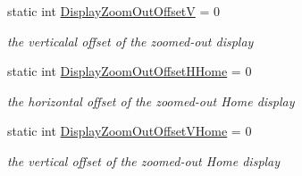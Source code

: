 \begin{DoxyCompactItemize}
\mbox{\label{class_t_display_a3c63a18e8901299ab56176c034072b1c}} 
static int \mbox{\hyperlink{class_t_display_a3c63a18e8901299ab56176c034072b1c}{Display\+Zoom\+Out\+OffsetV}} = 0
\begin{DoxyCompactList}\small\item\em the verticalal offset of the zoomed-\/out display \end{DoxyCompactList}\item 
\mbox{\label{class_t_display_a62c3d449d00b1a063a4bf7f212968e87}} 
static int \mbox{\hyperlink{class_t_display_a62c3d449d00b1a063a4bf7f212968e87}{Display\+Zoom\+Out\+Offset\+H\+Home}} = 0
\begin{DoxyCompactList}\small\item\em the horizontal offset of the zoomed-\/out \textquotesingle{}Home\textquotesingle{} display \end{DoxyCompactList}\item 
\mbox{\label{class_t_display_a758f553cef2eb9b3eee4d491454a7da9}} 
static int \mbox{\hyperlink{class_t_display_a758f553cef2eb9b3eee4d491454a7da9}{Display\+Zoom\+Out\+Offset\+V\+Home}} = 0
\begin{DoxyCompactList}\small\item\em the vertical offset of the zoomed-\/out \textquotesingle{}Home\textquotesingle{} display \end{DoxyCompactList}\end{DoxyCompactItemize}
